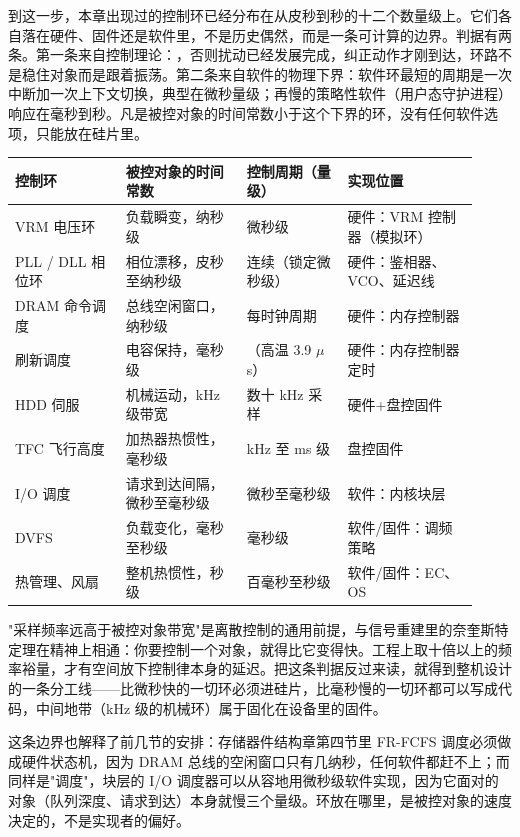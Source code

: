 
到这一步，本章出现过的控制环已经分布在从皮秒到秒的十二个数量级上。它们各自落在硬件、固件还是软件里，不是历史偶然，而是一条可计算的边界。判据有两条。第一条来自控制理论：，否则扰动已经发展完成，纠正动作才刚到达，环路不是稳住对象而是跟着振荡。第二条来自软件的物理下界：软件环最短的周期是一次中断加一次上下文切换，典型在微秒量级；再慢的策略性软件（用户态守护进程）响应在毫秒到秒。凡是被控对象的时间常数小于这个下界的环，没有任何软件选项，只能放在硅片里。

\begin{longtable}{L{0.22\linewidth}L{0.24\linewidth}L{0.20\linewidth}L{0.26\linewidth}}
\toprule
控制环 & 被控对象的时间常数 & 控制周期（量级） & 实现位置 \\
\midrule
VRM 电压环 & 负载瞬变，纳秒级 & 微秒级 & 硬件：VRM 控制器（模拟环） \\
PLL / DLL 相位环 & 相位漂移，皮秒至纳秒级 & 连续（锁定微秒级） & 硬件：鉴相器、VCO、延迟线 \\
DRAM 命令调度 & 总线空闲窗口，纳秒级 & 每时钟周期 & 硬件：内存控制器 \\
刷新调度 & 电容保持，毫秒级 & （高温 3.9 $\mu$s） & 硬件：内存控制器定时 \\
HDD 伺服 & 机械运动，kHz 级带宽 & 数十 kHz 采样 & 硬件+盘控固件 \\
TFC 飞行高度 & 加热器热惯性，毫秒级 & kHz 至 ms 级 & 盘控固件 \\
I/O 调度 & 请求到达间隔，微秒至毫秒级 & 微秒至毫秒级 & 软件：内核块层 \\
DVFS & 负载变化，毫秒至秒级 & 毫秒级 & 软件/固件：调频策略 \\
热管理、风扇 & 整机热惯性，秒级 & 百毫秒至秒级 & 软件/固件：EC、OS \\
\bottomrule
\end{longtable}

\begin{classicnote}
"采样频率远高于被控对象带宽"是离散控制的通用前提，与信号重建里的奈奎斯特定理在精神上相通：你要控制一个对象，就得比它变得快。工程上取十倍以上的频率裕量，才有空间放下控制律本身的延迟。把这条判据反过来读，就得到整机设计的一条分工线——比微秒快的一切环必须进硅片，比毫秒慢的一切环都可以写成代码，中间地带（kHz 级的机械环）属于固化在设备里的固件。
\end{classicnote}

这条边界也解释了前几节的安排：存储器件结构章第四节里 FR-FCFS 调度必须做成硬件状态机，因为 DRAM 总线的空闲窗口只有几纳秒，任何软件都赶不上；而同样是"调度"，块层的 I/O 调度器可以从容地用微秒级软件实现，因为它面对的对象（队列深度、请求到达）本身就慢三个量级。环放在哪里，是被控对象的速度决定的，不是实现者的偏好。

